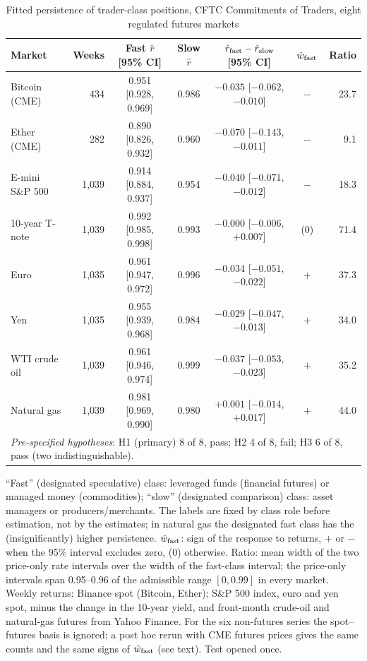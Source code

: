 \documentclass[12pt]{article}
\theoremstyle{definition}
\theoremstyle{remark}
\begin{document}
\begin{table}[t]\centering\small
\begin{threeparttable}
\caption{Fitted persistence of trader-class positions, CFTC Commitments of Traders, eight regulated futures markets}\label{tab:cot}
\setlength{\tabcolsep}{2.2pt}\footnotesize
\begin{tabular}{lrccccr}
\toprule
Market & Weeks & Fast $\hat r$ [95\% CI] & Slow $\hat r$ & $\hat r_{\rm fast}-\hat r_{\rm slow}$ [95\% CI] & $\hat w_{\rm fast}$ & Ratio\\
\midrule
Bitcoin (CME) & 434 & 0.951 [0.928, 0.969] & 0.986 & $-0.035$ [$-0.062$, $-0.010$] & $-$ & 23.7\\
Ether (CME) & 282 & 0.890 [0.826, 0.932] & 0.960 & $-0.070$ [$-0.143$, $-0.011$] & $-$ & 9.1\\
E-mini S\&P 500 & 1{,}039 & 0.914 [0.884, 0.937] & 0.954 & $-0.040$ [$-0.071$, $-0.012$] & $-$ & 18.3\\
10-year T-note & 1{,}039 & 0.992 [0.985, 0.998] & 0.993 & $-0.000$ [$-0.006$, $+0.007$] & (0) & 71.4\\
Euro & 1{,}035 & 0.961 [0.947, 0.972] & 0.996 & $-0.034$ [$-0.051$, $-0.022$] & $+$ & 37.3\\
Yen & 1{,}035 & 0.955 [0.939, 0.968] & 0.984 & $-0.029$ [$-0.047$, $-0.013$] & $+$ & 34.0\\
WTI crude oil & 1{,}039 & 0.961 [0.946, 0.974] & 0.999 & $-0.037$ [$-0.053$, $-0.023$] & $+$ & 35.2\\
Natural gas & 1{,}039 & 0.981 [0.969, 0.990] & 0.980 & $+0.001$ [$-0.014$, $+0.017$] & $+$ & 44.0\\
\midrule
\multicolumn{7}{l}{\emph{Pre-specified hypotheses}: H1 (primary) 8 of 8, pass; H2 4 of 8, fail; H3 6 of 8, pass (two indistinguishable).}\\
\bottomrule
\end{tabular}
\begin{tablenotes}\footnotesize\item ``Fast'' (designated speculative) class: leveraged funds (financial futures) or managed money (commodities); ``slow'' (designated comparison) class: asset managers or producers/merchants. The labels are fixed by class role before estimation, not by the estimates; in natural gas the designated fast class has the (insignificantly) higher persistence. $\hat w_{\rm fast}$: sign of the response to returns, $+$ or $-$ when the 95\% interval excludes zero, (0) otherwise. Ratio: mean width of the two price-only rate intervals over the width of the fast-class interval; the price-only intervals span 0.95--0.96 of the admissible range $[0,0.99]$ in every market. Weekly returns: Binance spot (Bitcoin, Ether); S\&P 500 index, euro and yen spot, minus the change in the 10-year yield, and front-month crude-oil and natural-gas futures from Yahoo Finance. For the six non-futures series the spot--futures basis is ignored; a post hoc rerun with CME futures prices gives the same counts and the same signs of $\hat w_{\rm fast}$ (see text). Test opened once.\end{tablenotes}
\end{threeparttable}
\end{table}
\end{document}

